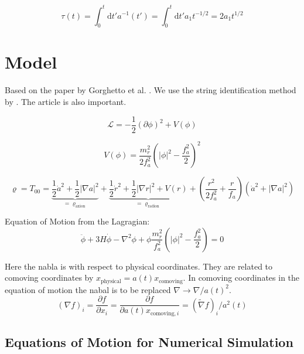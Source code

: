 \documentclass[a4paper]{article}
\begin{document}
\begin{equation}
    \tau(t) = \int_0^t \mathrm{d} t' a^{-1}(t') = \int_0^t \mathrm{d} t' a_1 t^{-1/2} = 2 a_1 t^{1/2}
\end{equation}

\section{Model}

Based on the paper by Gorghetto et al. \cite{axions_from_strings}.
We use the string identification method by \cite{axion_dark_matter_strings_and_their_cores}.
The article \cite{improved_estimation_hiramatsu} is also important.

\begin{equation}
    \mathcal{L} = - \frac{1}{2} ( \partial \phi )^2 + V(\phi)
\end{equation}

\begin{equation}
    V(\phi) = \frac{m_r^2}{2 f_a^2}\left( |\phi|^2 - \frac{f_a^2}{2} \right)^2
\end{equation}

\begin{equation}
    \varrho = T_{00} = \underbrace{\frac{1}{2} \dot{a}^2 + \frac{1}{2} | \nabla a|^2}_{= \varrho_\mathrm{axion}}
    + \underbrace{ \frac{1}{2} \dot{r}^2 + \frac{1}{2} | \nabla r|^2 + V(r) }_{= \varrho_\mathrm{radion}}
    + \left(\frac{r^2}{2 f_a^2} + \frac{r}{f_a} \right) (\dot{a}^2 + |\nabla a|^2)
\end{equation}

Equation of Motion from the Lagragian:
\begin{equation}
    \ddot{\phi} + 3 H \dot{\phi} - \nabla^2 \phi + \phi \frac{m_r^2}{f_a^2} \left( |\phi|^2 - \frac{f_a^2}{2} \right) = 0
\end{equation}

Here the nabla is with respect to physical coordinates. They are related to comoving  coordinates by $x_\mathrm{physical} = a(t) x_\mathrm{comoving}$.
In comoving coordinates in the equation of motion the nabal is to be replaced $\nabla \to \nabla / a(t)^2$.
\begin{equation}
    (\nabla f)_i = \frac{\partial f}{\partial x_i} = \frac{\partial f}{\partial a(t) x_{\mathrm{comoving}, i}} = (\tilde{\nabla} f)_i / a^2(t)
\end{equation}

\subsection{Equations of Motion for Numerical Simulation}
\end{document}

